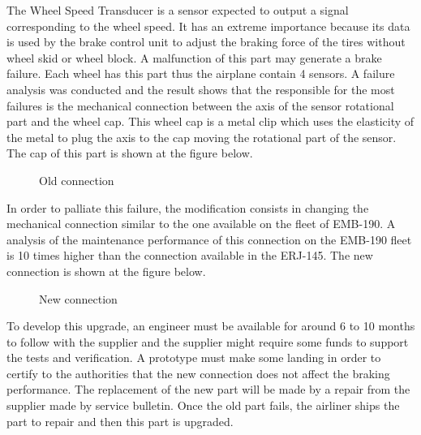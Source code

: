 The Wheel Speed Transducer is a sensor expected to output a signal corresponding to the wheel speed. It has an extreme importance because its data is used by the brake control unit to adjust the braking force of the tires without wheel skid or wheel block. A malfunction of this part may generate a brake failure. Each wheel has this part thus the airplane contain 4 sensors.
A failure analysis was conducted and the result shows that the responsible for the most failures is the mechanical connection between the axis of the sensor rotational part and the wheel cap. This wheel cap is a metal clip which uses the elasticity of the metal to plug the axis to the cap moving the rotational part of the sensor. The cap of this part is shown at the figure below.

\begin{figure}[H] %
\caption{Old connection}
\label{fig:wheelspeed1}
\end{figure}

In order to palliate this failure, the modification consists in changing the mechanical connection similar to the one available on the fleet of EMB-190. A analysis of the maintenance performance of this connection on the EMB-190 fleet is 10 times higher than the connection available in the ERJ-145. The new connection is shown at the figure below.

\begin{figure}[H] %
\caption{New connection}
\label{fig:WST_2}
\end{figure}

To develop this upgrade, an engineer must be available for around 6 to 10 months to follow with the supplier and the supplier might require some funds to support the tests and verification. A prototype must make some landing in order to certify to the authorities that the new connection does not affect the braking performance. The replacement of the new part will be made by a repair from the supplier made by service bulletin. Once the old part fails, the airliner ships the part to repair and then this part is upgraded.
